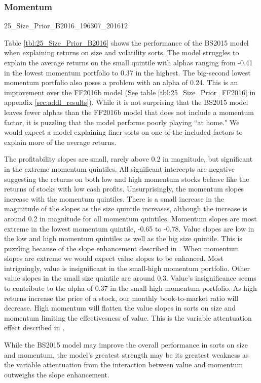 
\subsubsection{Momentum}

{25_Size_Prior_B2016_196307_201612}

Table \ref{tbl:25_Size_Prior_B2016} shows the performance of the BS2015 model when
explaining returns on size and volatility sorts. The model struggles to explain the
average returns on the small quintile with alphas ranging from -0.41 in the lowest
momentum portfolio to 0.37 in the highest. The big-second lowest momentum portfolio also
poses a problem with an alpha of 0.24. This is an improvement over the FF2016b model (See
table \ref{tbl:25_Size_Prior_FF2016} in appendix \ref{sec:addl_results}). While it is not
surprising that the BS2015 model leaves fewer alphas than the FF2016b model that does not
include a momentum factor, it is puzzling that the model performs poorly playing ``at
home." We would expect a model explaining finer sorts on one of the included factors to
explain more of the average returns.

The profitability slopes are small, rarely above 0.2 in magnitude, but significant in the
extreme momentum quintiles. All significant intercepts are negative suggesting the returns
on both low and high momentum stocks behave like the returns of stocks with low cash
profits. Unsurprisingly, the momentum slopes increase with the momentum quintiles. There
is a small increase in the maginitude of the slopes as the size quintile increases,
although the increase is around 0.2 in magnitude for all momentum quintiles. Momentum
slopes are most extreme in the lowest momentum quintile, -0.65 to -0.78. Value slopes are
low in the low and high momentum quintiles as well as the big size quintile. This is
puzzling because of the slope enhancement described in \textcite{fama2015incremental}.
When momentum slopes are extreme we would expect value slopes to be enhanced. Most
intriguingly, value is insignificant in the small-high momentum portfolio. Other value
slopes in the small size quintile are around 0.3. Value's insignificance seems to
contribute to the alpha of 0.37 in the small-high momentum portfolio. As high returns
increase the price of a stock, our monthly book-to-market ratio will decrease. High
momentum will flatten the value slopes in sorts on size and momentum limiting the
effectivesness of value. This is the variable attentuation effect described in
\textcite{fama2015incremental}.

While the BS2015 model may improve the overall performance in sorts on size and momentum,
the model's greatest strength may be its greatest weakness as the variable attentuation
from the interaction between value and momentum outweighs the slope enhancement.
